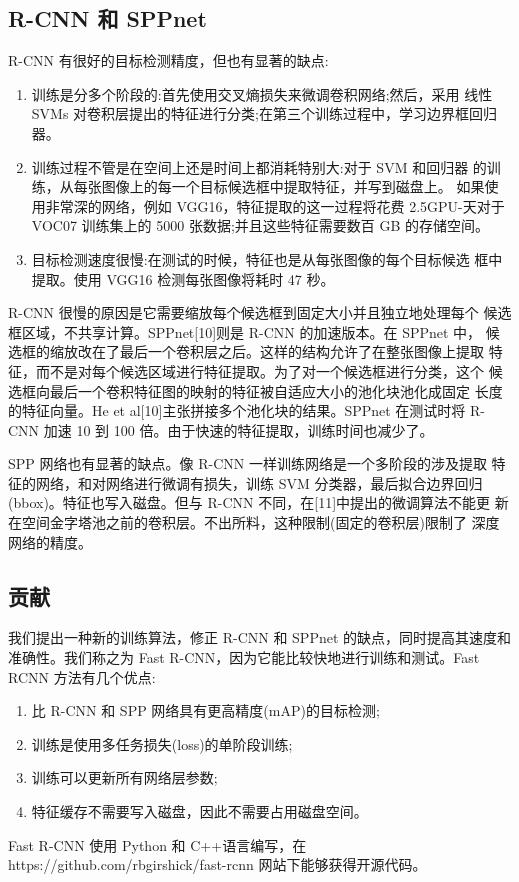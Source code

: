 \subsection{R-CNN 和 SPPnet}
\par R-CNN 有很好的目标检测精度，但也有显著的缺点:
\par \begin{enumerate}
    \item 训练是分多个阶段的:首先使用交叉熵损失来微调卷积网络;然后，采用 线性 SVMs 对卷积层提出的特征进行分类;在第三个训练过程中，学习边界框回归器。
    \item 训练过程不管是在空间上还是时间上都消耗特别大:对于 SVM 和回归器 的训练，从每张图像上的每一个目标候选框中提取特征，并写到磁盘上。 如果使用非常深的网络，例如 VGG16，特征提取的这一过程将花费 2.5GPU-天对于 VOC07 训练集上的 5000 张数据;并且这些特征需要数百 GB 的存储空间。
    \item 目标检测速度很慢:在测试的时候，特征也是从每张图像的每个目标候选 框中提取。使用 VGG16 检测每张图像将耗时 47 秒。
\end{enumerate}
\par R-CNN 很慢的原因是它需要缩放每个候选框到固定大小并且独立地处理每个 候选框区域，不共享计算。SPPnet[10]则是 R-CNN 的加速版本。在 SPPnet 中， 候选框的缩放改在了最后一个卷积层之后。这样的结构允许了在整张图像上提取 特征，而不是对每个候选区域进行特征提取。为了对一个候选框进行分类，这个 候选框向最后一个卷积特征图的映射的特征被自适应大小的池化块池化成固定 长度的特征向量。He et al[10]主张拼接多个池化块的结果。SPPnet 在测试时将 R- CNN 加速 10 到 100 倍。由于快速的特征提取，训练时间也减少了。
\par SPP 网络也有显著的缺点。像 R-CNN 一样训练网络是一个多阶段的涉及提取 特征的网络，和对网络进行微调有损失，训练 SVM 分类器，最后拟合边界回归(bbox)。特征也写入磁盘。但与 R-CNN 不同，在[11]中提出的微调算法不能更 新在空间金字塔池之前的卷积层。不出所料，这种限制(固定的卷积层)限制了 深度网络的精度。

\subsection {贡献}
\par 我们提出一种新的训练算法，修正 R-CNN 和 SPPnet 的缺点，同时提高其速度和准确性。我们称之为 Fast R-CNN，因为它能比较快地进行训练和测试。Fast RCNN 方法有几个优点:
\par \begin{enumerate}
    \item 比 R-CNN 和 SPP 网络具有更高精度(mAP)的目标检测;
    \item 训练是使用多任务损失(loss)的单阶段训练;
    \item 训练可以更新所有网络层参数;
    \item 特征缓存不需要写入磁盘，因此不需要占用磁盘空间。
\end{enumerate}
\par Fast R-CNN 使用 Python 和 C++语言编写，在 https://github.com/rbgirshick/fast-rcnn 网站下能够获得开源代码。

